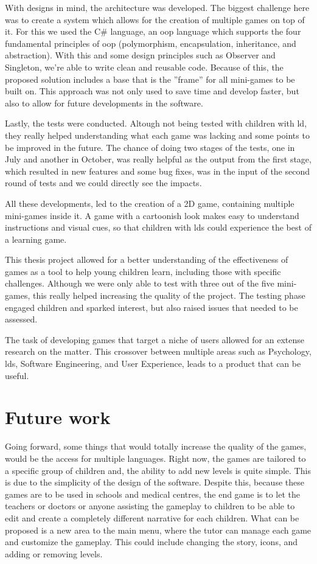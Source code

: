 With designs in mind, the architecture was developed. The biggest challenge here was to create a system which allows for the creation of multiple games on top of it. For this we used the C\# language, an \gls{oop} language which supports the four fundamental principles of \gls{oop} (polymorphism, encapsulation, inheritance, and abstraction). With this and some design principles such as Observer and Singleton, we're able to write clean and reusable code. Because of this, the proposed solution includes a base that is the ''frame'' for all mini-games to be built on. This approach was not only used to save time and develop faster, but also to allow for future developments in the software. 

Lastly, the tests were conducted. Altough not being tested with children with \gls{ld}, they really helped understanding what each game was lacking and some points to be improved in the future. The chance of doing two stages of the tests, one in July and another in October, was really helpful as the output from the first stage, which resulted in new features and some bug fixes, was in the input of the second round of tests and we could directly see the impacts.

All these developments, led to the creation of a 2D game, containing multiple mini-games inside it. A game with a cartoonish look makes easy to understand instructions and visual cues, so that children with \glspl{ld} could experience the best of a learning game.

This thesis project allowed for a better understanding of the effectiveness of games as a tool to help young children learn, including those with specific challenges. Although we were only able to test with three out of the five mini-games, this really helped increasing the quality of the project. The testing phase engaged children and sparked interest, but also raised issues that needed to be assessed.

The task of developing games that target a niche of users allowed for an extense research on the matter. This crossover between multiple areas such as Psychology, \glspl{ld}, Software Engineering, and User Experience, leads to a product that can be useful. 

\section{Future work}
\label{futureWork}

Going forward, some things that would totally increase the quality of the games, would be the access for multiple languages. Right now, the games are tailored to a specific group of children and, the ability to add new levels is quite simple. This is due to the simplicity of the design of the software. Despite this, because these games are to be used in schools and medical centres, the end game is to let the teachers or doctors or anyone assisting the gameplay to children to be able to edit and create a completely different narrative for each children. What can be proposed is a new area to the main menu, where the tutor can manage each game and customize the gameplay. This could include changing the story, icons, and adding or removing levels.

